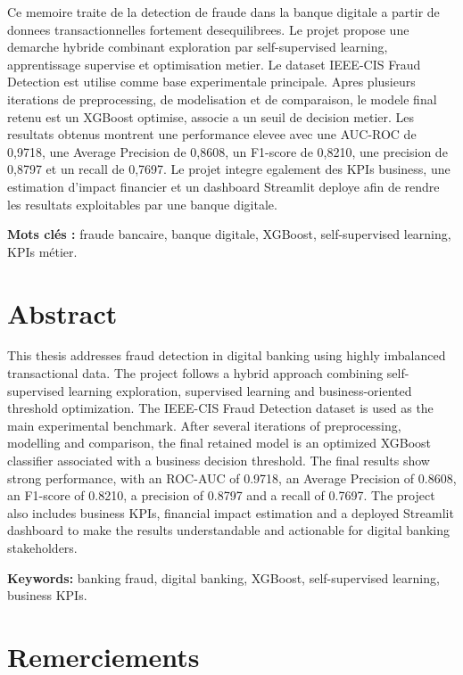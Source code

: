﻿\documentclass[12pt,a4paper,oneside]{report}
\begin{document}
Ce memoire traite de la detection de fraude dans la banque digitale a partir de donnees transactionnelles fortement desequilibrees. Le projet propose une demarche hybride combinant exploration par self-supervised learning, apprentissage supervise et optimisation metier. Le dataset IEEE-CIS Fraud Detection est utilise comme base experimentale principale. Apres plusieurs iterations de preprocessing, de modelisation et de comparaison, le modele final retenu est un XGBoost optimise, associe a un seuil de decision metier. Les resultats obtenus montrent une performance elevee avec une AUC-ROC de 0,9718, une Average Precision de 0,8608, un F1-score de 0,8210, une precision de 0,8797 et un recall de 0,7697. Le projet integre egalement des KPIs business, une estimation d'impact financier et un dashboard Streamlit deploye afin de rendre les resultats exploitables par une banque digitale.

\textbf{Mots clés :} fraude bancaire, banque digitale, XGBoost, self-supervised learning, KPIs métier.

\chapter*{Abstract}

This thesis addresses fraud detection in digital banking using highly imbalanced transactional data. The project follows a hybrid approach combining self-supervised learning exploration, supervised learning and business-oriented threshold optimization. The IEEE-CIS Fraud Detection dataset is used as the main experimental benchmark. After several iterations of preprocessing, modelling and comparison, the final retained model is an optimized XGBoost classifier associated with a business decision threshold. The final results show strong performance, with an ROC-AUC of 0.9718, an Average Precision of 0.8608, an F1-score of 0.8210, a precision of 0.8797 and a recall of 0.7697. The project also includes business KPIs, financial impact estimation and a deployed Streamlit dashboard to make the results understandable and actionable for digital banking stakeholders.

\textbf{Keywords:} banking fraud, digital banking, XGBoost, self-supervised learning, business KPIs.

\chapter*{Remerciements}
\end{document}
